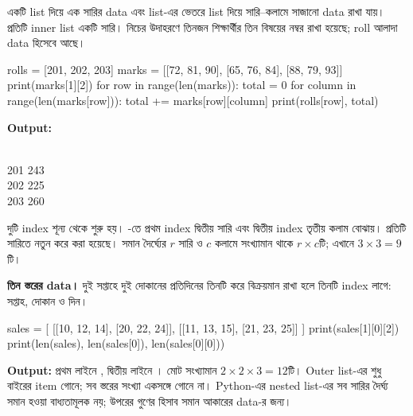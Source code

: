 
একটি list দিয়ে এক সারির data এবং list-এর ভেতরে list দিয়ে সারি–কলামে
সাজানো data রাখা যায়। প্রতিটি inner list একটি সারি। নিচের উদাহরণে তিনজন
শিক্ষার্থীর তিন বিষয়ের নম্বর রাখা হয়েছে; roll আলাদা data হিসেবে আছে।

\begin{pythoncode}
rolls = [201, 202, 203]
marks = [[72, 81, 90], [65, 76, 84], [88, 79, 93]]
print(marks[1][2])
for row in range(len(marks)):
    total = 0
    for column in range(len(marks[row])):
        total += marks[row][column]
    print(rolls[row], total)
\end{pythoncode}
\textbf{Output:}
\begin{codebox}\begin{english}\\
201 243\\
202 225\\
203 260
\end{english}\end{codebox}

\begin{center}
\end{center}
দুটি index শূন্য থেকে শুরু হয়। -তে প্রথম index দ্বিতীয়
সারি এবং দ্বিতীয় index তৃতীয় কলাম বোঝায়। প্রতিটি সারিতে নতুন করে
 করা হয়েছে। সমান দৈর্ঘ্যের \(r\) সারি ও \(c\) কলামে
সংখ্যামান থাকে \(r\times c\)টি; এখানে \(3\times3=9\)টি।

\textbf{তিন স্তরের data।} দুই সপ্তাহে দুই দোকানের প্রতিদিনের তিনটি করে
বিক্রয়মান রাখা হলে তিনটি index লাগে: সপ্তাহ, দোকান ও দিন।
\begin{pythoncode}
sales = [
    [[10, 12, 14], [20, 22, 24]],
    [[11, 13, 15], [21, 23, 25]]
]
print(sales[1][0][2])
print(len(sales), len(sales[0]), len(sales[0][0]))
\end{pythoncode}
\textbf{Output:} প্রথম লাইনে , দ্বিতীয় লাইনে ।
মোট সংখ্যামান \(2\times2\times3=12\)টি। Outer list-এর 
শুধু বাইরের item গোনে; সব স্তরের সংখ্যা একসঙ্গে গোনে না।
Python-এর nested list-এর সব সারির দৈর্ঘ্য সমান হওয়া বাধ্যতামূলক নয়;
উপরের গুণের হিসাব সমান আকারের data-র জন্য।

